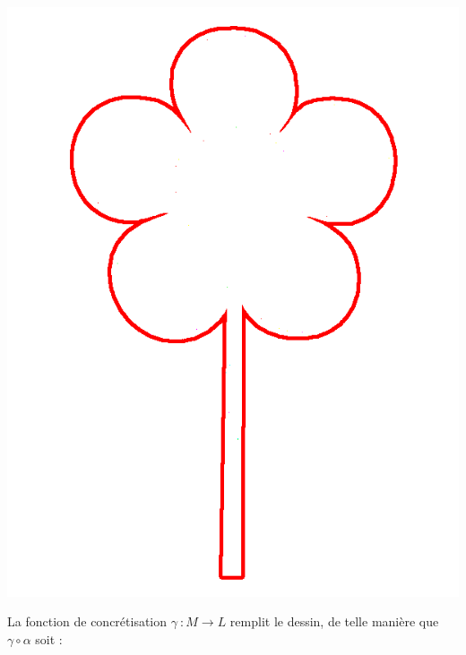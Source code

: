 \documentclass[french]{article}
\begin{document}
  \begin{center}
    \includegraphics[scale=0.19]{pictures/flower4.png}
  \end{center}

  La fonction de concrétisation $\gamma\ : M \rightarrow L$ remplit le dessin, de telle manière que $\gamma \circ \alpha$  soit :
  
\end{document}
